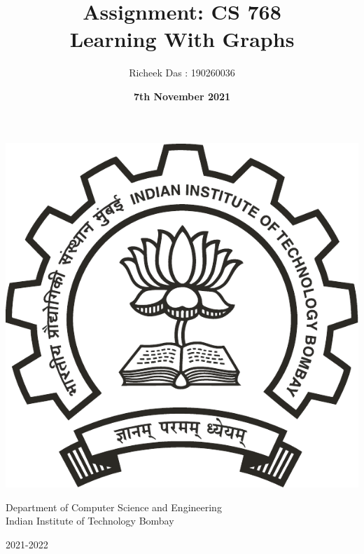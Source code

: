 \documentclass[11pt]{article}
\title{\huge Assignment: CS 768 \\ 
        Learning With Graphs}
\author{\Large Richeek Das : 190260036}
\date{\textbf{7th November 2021}}
\begin{document}
    
    \maketitle
    
    \pagestyle{fancy}
    \fancyhf{}
    \renewcommand{\footrulewidth}{1pt}
    
    \renewcommand{\labelenumi}{(\alph{enumi})}
    \renewcommand{\labelenumii}{(\arabic{enumii})}
    
    \tableofcontents{}
    
    \vfill
    
    \begin{center}
        \includegraphics[scale=0.30]{iitb.pdf}
        
        \vspace{0.5cm}
        {\normalsize
            Department of Computer Science and Engineering \\
            Indian Institute of Technology Bombay  \par}
        
        {\normalsize 2021-2022 \par}
        \vspace{0.5cm}
    \end{center}
    
\end{document}

